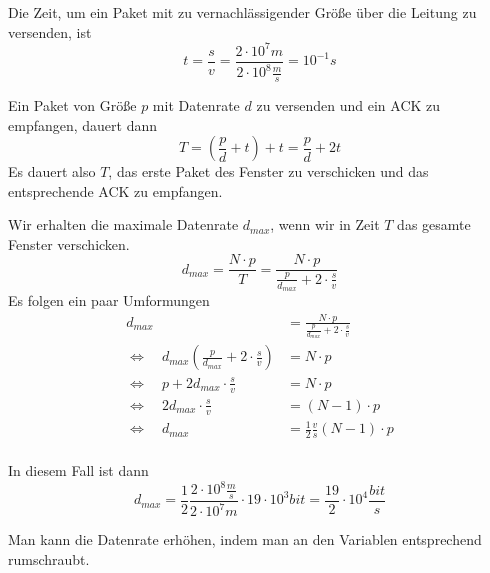 \documentclass[10pt,a4paper]{article}
\begin{document}
Die Zeit, um ein Paket mit zu vernachlässigender Größe über die Leitung zu
versenden, ist
\begin{equation}
  t = \frac{s}{v} = \frac{2 \cdot 10^{7} m}{2 \cdot 10^{8} \frac{m}{s}} = 10^{-1}s
\end{equation}

Ein Paket von Größe $p$ mit Datenrate $d$ zu versenden und ein ACK zu empfangen,
dauert dann
\begin{equation}
  T = (\frac{p}{d} + t) + t = \frac{p}{d} + 2t
\end{equation}
Es dauert also $T$, das erste Paket des Fenster zu verschicken und das
entsprechende ACK zu empfangen.

Wir erhalten die maximale Datenrate $d_{max}$, wenn wir in Zeit $T$ das gesamte
Fenster verschicken.
\begin{equation}
  d_{max} = \frac{N \cdot p}{T} = \frac{N \cdot p}{\frac{p}{d_{max}} + 2 \cdot \frac{s}{v}}
\end{equation}
Es folgen ein paar Umformungen
\begin{align*}
  d_{max} & = \frac{N \cdot p}{\frac{p}{d_{max}} + 2 \cdot \frac{s}{v}}\\
  \Leftrightarrow \quad d_{max} \left( \frac{p}{d_{max}} + 2 \cdot \frac{s}{v} \right) & = N \cdot p\\
  \Leftrightarrow \quad p + 2 d_{max} \cdot \frac{s}{v} & = N \cdot p\\
  \Leftrightarrow \quad 2 d_{max} \cdot \frac{s}{v} & = (N - 1) \cdot p\\
  \Leftrightarrow \quad d_{max} & = \frac{1}{2} \frac{v}{s} (N - 1) \cdot p\\
\end{align*}

In diesem Fall ist dann
\begin{equation}
  d_{max} = \frac{1}{2} \frac{2 \cdot 10^{8} \frac{m}{s}}{2 \cdot 10^{7}m} \cdot 19 \cdot 10^{3} bit = \frac{19}{2} \cdot 10^{4} \frac{bit}{s}
\end{equation}

Man kann die Datenrate erhöhen, indem man an den Variablen entsprechend
rumschraubt.
\end{document}
